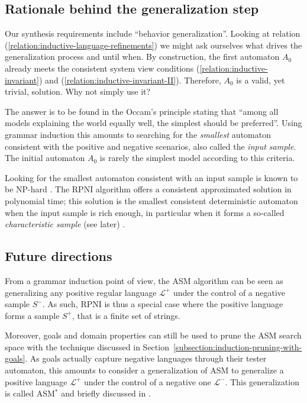 \subsection{Rationale behind the generalization step}

Our synthesis requirements include ``behavior generalization''. Looking at relation (\ref{relation:inductive-language-refinements}) we might ask ourselves what drives the generalization process and until when. By construction, the first automaton $A_0$ already meets the consistent system view conditions (\ref{relation:inductive-invariant}) and (\ref{relation:inductive-invariant-II}). Therefore, $A_0$ is a valid, yet trivial, solution. Why not simply use it?

The answer is to be found in the Occam's principle stating that ``among all models explaining the world equally well, the simplest should be preferred''. Using grammar induction this amounts to searching for the \emph{smallest} automaton consistent with the positive and negative scenarios, also called the \emph{input sample}. The initial automaton $A_0$ is rarely the simplest model according to this criteria. 

Looking for the smallest automaton consistent with an input sample is known to be NP-hard \cite{Gold:1978, Angluin:1978}. The RPNI algorithm offers a consistent approximated solution in polynomial time; this solution is the smallest consistent deterministic automaton when the input sample is rich enough, in particular when it forms a so-called \emph{characteristic sample} (see later) \cite{Oncina:1992}.

\subsection{Future directions}

From a grammar induction point of view, the ASM algorithm can be seen as generalizing any positive regular language $\mathcal{L}^+$ under the control of a negative sample $S^-$. As such, RPNI is thus a special case where the positive language forms a sample $S^+$, that is a finite set of strings.

Moreover, goals and domain properties can still be used to prune the ASM search space with the technique discussed in Section~\ref{subsection:induction-pruning-with-goals}. As goals actually capture negative languages through their tester automaton, this amounts to consider a generalization of ASM to generalize a positive language $\mathcal{L}^+$ under the control of a negative one $\mathcal{L}^-$. This generalization is called ASM$^*$ and briefly discussed in \cite{Lambeau:2008}.
